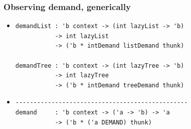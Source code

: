\documentclass{beamer}
\begin{document}

\begin{frame}[fragile]
\frametitle{Observing demand, generically}
\begin{itemize}
\item<1->[]
\begin{verbatim}
demandList : 'b context -> (int lazyList -> 'b)
           -> int lazyList
           -> ('b * intDemand listDemand thunk)

demandTree : 'b context -> (int lazyTree -> 'b)
           -> int lazyTree
           -> ('b * intDemand treeDemand thunk)
\end{verbatim}
\item<2->[]
\begin{verbatim}
------------------------------------------------
demand     : 'b context -> ('a -> 'b) -> 'a
           -> ('b * ('a DEMAND) thunk)
\end{verbatim}
\end{itemize}
\end{frame}

\end{document}
